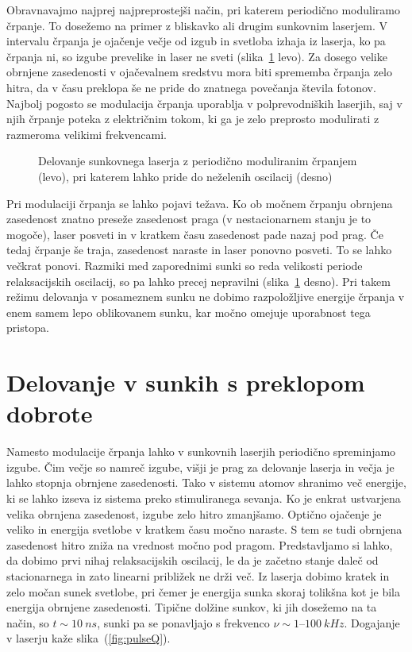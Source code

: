 Obravnavajmo najprej najpreprostejši način, pri katerem periodično moduliramo črpanje.
To dosežemo na primer z bliskavko ali drugim sunkovnim laserjem. V 
intervalu 
črpanja je ojačenje večje od izgub in svetloba izhaja iz laserja, ko pa črpanja 
ni, so izgube prevelike in laser ne sveti (slika~\ref{fig:Gswitch} levo). Za dosego velike
obrnjene zasedenosti v ojačevalnem sredstvu mora biti sprememba črpanja zelo hitra, 
da v času preklopa še ne pride do znatnega povečanja števila fotonov. 
Najbolj pogosto se modulacija črpanja uporablja
v polprevodniških laserjih, saj v njih črpanje poteka z električnim tokom, ki 
ga je zelo preprosto modulirati z razmeroma velikimi frekvencami. 
\begin{figure}[h]
\centering
\def\svgwidth{140truemm} 

\caption{Delovanje sunkovnega laserja z periodično moduliranim črpanjem (levo), 
pri katerem lahko pride do neželenih oscilacij (desno)}
\label{fig:Gswitch}
\end{figure}

Pri modulaciji črpanja se lahko pojavi težava. Ko ob močnem črpanju 
obrnjena zasedenost znatno preseže zasedenost praga (v nestacionarnem stanju 
je to mogoče), laser posveti in v kratkem času zasedenost pade nazaj pod prag. 
Če tedaj črpanje še traja, zasedenost naraste in laser ponovno posveti. 
To se lahko večkrat ponovi. Razmiki med zaporednimi sunki
so reda velikosti periode relaksacijskih oscilacij, so pa lahko precej
nepravilni  (slika~\ref{fig:Gswitch} desno). Pri takem režimu delovanja v posameznem 
sunku ne dobimo razpoložljive energije črpanja v enem samem lepo oblikovanem sunku, 
kar močno omejuje uporabnost tega pristopa.


\section{Delovanje v sunkih s preklopom dobrote}
Namesto modulacije črpanja lahko v sunkovnih laserjih periodično spreminjamo 
izgube. Čim večje so namreč izgube, višji 
je prag za delovanje laserja in 
večja je lahko stopnja obrnjene zasedenosti. Tako v sistemu atomov shranimo več 
energije, ki se lahko izseva iz sistema preko stimuliranega sevanja. 
Ko je enkrat ustvarjena velika obrnjena zasedenost, izgube zelo hitro zmanjšamo. 
Optično ojačenje je veliko in energija svetlobe v kratkem času močno naraste. 
S tem se tudi obrnjena zasedenost hitro zniža na vrednost močno pod pragom.
Predstavljamo si lahko, da dobimo prvi nihaj relaksacijskih oscilacij, le da
je začetno stanje daleč od stacionarnega in zato linearni približek ne drži več.
Iz laserja dobimo kratek in zelo močan sunek svetlobe, pri čemer je energija
sunka skoraj tolikšna kot je bila energija obrnjene zasedenosti. Tipične
dolžine sunkov, ki jih dosežemo na ta način, so $t \sim 10~\si{ns}$, sunki
pa se ponavljajo s frekvenco $\nu \sim 1$--$100~\si{kHz}$.
Dogajanje v laserju kaže slika~(\ref{fig:pulseQ}).

